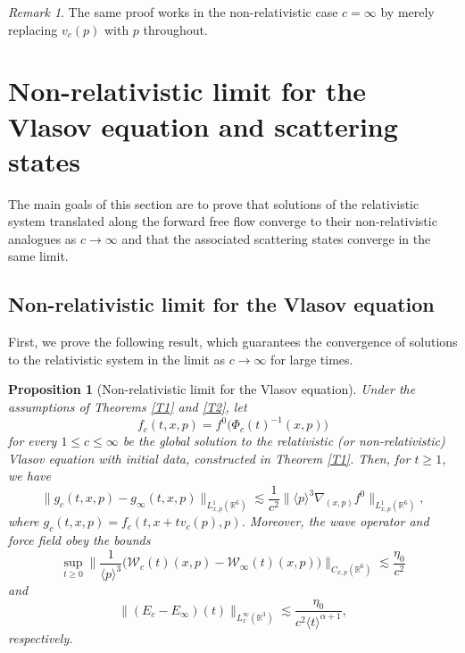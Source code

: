 \documentclass[reqno, 11pt, letterpaper]{amsart}
\newtheorem{proposition}[theorem]{Proposition}
\theoremstyle{remark}
\newtheorem{remark}[theorem]{Remark}
\numberwithin{equation}{section}
\numberwithin{theorem}{section}
\numberwithin{table}{section}
\numberwithin{figure}{section}
\begin{document}
\begin{remark}
The same proof works in the non-relativistic case $c=\infty$ by merely replacing $v_c(p)$ with $p$ throughout. 
\end{remark}


\section{Non-relativistic limit for the Vlasov equation and scattering states}\label{sec: Non-relativistic limit for the Vlasov equation and scattering states}

The main goals of this section are to prove that solutions of the relativistic system translated along the forward free flow converge to their non-relativistic analogues as $c \to \infty$ and that the associated scattering states converge in the same limit.


\subsection{Non-relativistic limit for the Vlasov equation}
First, we prove the following result, which guarantees the convergence of solutions to the relativistic system in the limit as $c \to \infty$ for large times.

\begin{proposition}[Non-relativistic limit for the Vlasov equation]\label{prop: nr limit for Vlasov}
Under the assumptions of Theorems \ref{T1} and \ref{T2}, let
$$f_c(t,x,p)=f^0\Big(\Phi_c(t)^{-1}(x,p)\Big)$$
for every $1 \leq c \leq \infty$
be the global solution to the relativistic (or non-relativistic) Vlasov equation with initial data,  constructed in Theorem \ref{T1}. Then, for $t\geq 1$, we have
\begin{equation}\label{eq: nr limit for Vlasov}
\|g_c(t,x,p)-g_\infty(t,x,p)\|_{L_{x,p}^1(\mathbb{R}^6)}\lesssim \frac{1}{c^2} \|\langle p \rangle^3\nabla_{(x,p)}f^0\|_{L_{x,p}^1(\mathbb{R}^6)},
\end{equation}
where $g_c(t,x,p)=f_c(t,x+tv_c(p),p)$. Moreover, the wave operator and force field obey the bounds
\begin{equation}\label{eq: nr limit for wave operators}
\sup_{t\geq0}\bigg\|\frac{1}{\langle p\rangle^3}\Big(\mathcal{W}_c(t)(x,p)-\mathcal{W}_\infty(t)(x,p)\Big)\bigg\|_{C_{x,p}(\mathbb{R}^6)}\lesssim \frac{\eta_0}{c^2}
\end{equation}
and
\begin{equation}\label{eq: nr limit for force field}
\|(E_c-E_\infty)(t)\|_{L_x^\infty(\mathbb{R}^3)}\lesssim\frac{\eta_0}{c^2\langle t\rangle^{\alpha+1}},
\end{equation}
respectively.
\end{proposition}
\end{document}
